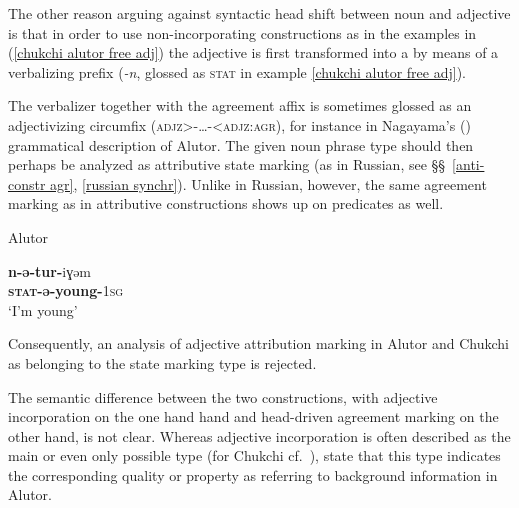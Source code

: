 The other reason arguing against syntactic head shift between noun and adjective is that in order to use non-incorporating constructions as in the examples in (\ref{chukchi alutor free adj}) the adjective is first transformed into a  by means of a verbalizing prefix (\textit{-n}, glossed as \textsc{stat} in example \ref{chukchi alutor free adj}).

The verbalizer together with the agreement affix is sometimes glossed as an adjectivizing circumfix (\textsc{adjz>-\dots-<adjz:agr}), for instance in Nagayama's (\citeyear{nagayama2003}) grammatical description of Alutor. The given noun phrase type should then perhaps be analyzed as attributive state marking (as in Russian, see \S\S~\ref{anti-constr agr}, \ref{russian synchr}). Unlike in Russian, however, the same agreement marking as in attributive constructions shows up on predicates as well.
\begin{exe}
\ex \rm{Alutor \citep{nagayama2003}}
\begin{xlist}
\ex
\gll	\textbf{n-ə-tur-}iɣəm\\
	\textbf{\textsc{stat}-ə-young-}\textsc{1sg}\\
\glt	‘I'm young’
\end{xlist}
\end{exe}
Consequently, an analysis of adjective attribution marking in Alutor and Chukchi as belonging to the state marking type is rejected.

The semantic difference between the two constructions, with adjective incorporation on the one hand hand and head\hyp{}driven agreement marking on the other hand, is not clear. Whereas adjective incorporation is often described as the main or even only possible type (for Chukchi cf.~\citealt[37, 101]{kampfe-etal1995}), \citet[288]{kibrik-etal2000} state that this type indicates the corresponding quality or property as referring to background information in Alutor.

